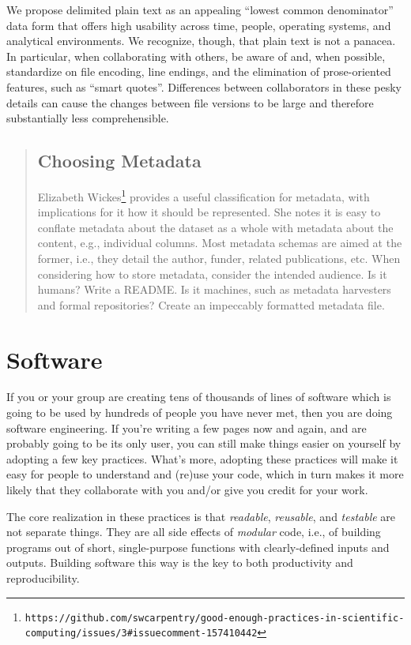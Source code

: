 \documentclass[10pt]{article}
\newcommand{\withurl}[2]{{#1}\footnote{\texttt{#2}}}
\begin{document}
We propose delimited plain text as an appealing ``lowest common
denominator'' data form that offers high usability across time, people,
operating systems, and analytical environments. We recognize, though,
that plain text is not a panacea. In particular, when collaborating with
others, be aware of and, when possible, standardize on file encoding,
line endings, and the elimination of prose-oriented features, such as
``smart quotes''. Differences between collaborators in these pesky
details can cause the changes between file versions to be large and
therefore substantially less comprehensible.

\begin{quote}
\subsection*{Choosing Metadata}

\withurl{Elizabeth Wickes}{https://github.com/swcarpentry/good-enough-practices-in-scientific-computing/issues/3\#issuecomment-157410442}
provides a useful classification for metadata, with implications for
it how it should be represented. She notes it is easy to conflate
metadata about the dataset as a whole with metadata about the content,
e.g., individual columns. Most metadata schemas are aimed at the
former, i.e., they detail the author, funder, related publications,
etc. When considering how to store metadata, consider the intended
audience. Is it humans? Write a README. Is it machines, such as
metadata harvesters and formal repositories? Create an impeccably
formatted metadata file.
\end{quote}

\section{Software}\label{software}

If you or your group are creating tens of thousands of lines of software
which is going to be used by hundreds of people you have never met, then
you are doing software engineering. If you're writing a few pages now
and again, and are probably going to be its only user, you can still
make things easier on yourself by adopting a few key practices. What's
more, adopting these practices will make it easy for people to
understand and (re)use your code, which in turn makes it more likely
that they collaborate with you and/or give you credit for your work.

The core realization in these practices is that \emph{readable},
\emph{reusable}, and \emph{testable} are not separate things. They are
all side effects of \emph{modular} code, i.e., of building programs out
of short, single-purpose functions with clearly-defined inputs and
outputs. Building software this way is the key to both productivity and
reproducibility.
\end{document}
